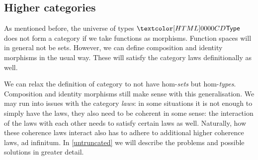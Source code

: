 \subsection{Higher categories}
\label{higher-cats}

As mentioned before, the universe of types $\Type$ does not form a
category if we take functions as morphisms. Function spaces will in
general not be sets. However, we can define composition and identity
morphisms in the usual way. These will satisfy the category laws
definitionally as well.

We can relax the definition of category to not have hom-\emph{sets}
but hom-\emph{types}. Composition and identity morphisms still make
sense with this generalisation. We may run into issues with the
category \emph{laws}: in some situations it is not enough to simply
have the laws, they also need to be coherent in some sense: the
interaction of the laws with each other needs to satisfy certain laws
as well. Naturally, how these coherence laws interact also has to
adhere to additional higher coherence laws, ad infinitum. In
\cref{untruncated} we will describe the problems and possible
solutions in greater detail.

